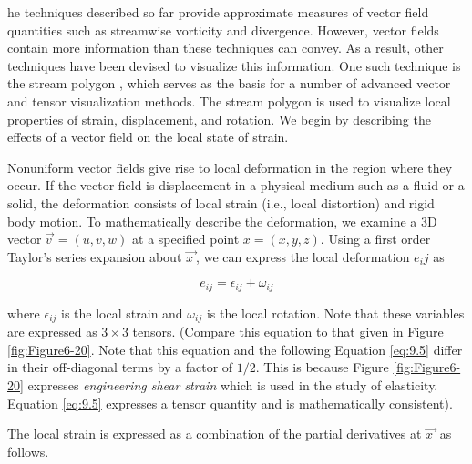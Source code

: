 he techniques described so far provide approximate measures of vector field quantities such as streamwise vorticity and divergence. However, vector fields contain more information than these techniques can convey. As a result, other techniques have been devised to visualize this information. One such technique is the stream polygon \cite{Schroeder91}, which serves as the basis for a number of advanced vector and tensor visualization methods. The stream polygon is used to visualize local properties of strain, displacement, and rotation. We begin by describing the effects of a vector field on the local state of strain.

Nonuniform vector fields give rise to local deformation in the region where they occur. If the vector field is displacement in a physical medium such as a fluid or a solid, the deformation consists of local strain (i.e., local distortion) and rigid body motion. To mathematically describe the deformation, we examine a 3D vector $\overrightarrow{v\ } = (u, v, w)$ at a specified point $x = (x, y, z)$. Using a first order Taylor's series expansion about $\overrightarrow{x\ }$, we can express the local deformation $e_ij$ as

\begin{equation}\label{eq:9.4}
e_{ij} = \epsilon_{ij} + \omega_{ij}
\end{equation}

where $\epsilon_{ij}$ is the local strain and $\omega_{ij}$ is the local rotation. Note that these variables are expressed as $3 \times 3$ tensors. (Compare this equation to that given in Figure \ref{fig:Figure6-20}. Note that this equation and the following Equation \ref{eq:9.5} differ in their off-diagonal terms by a factor of $1/2$. This is because Figure \ref{fig:Figure6-20} expresses \emph{engineering shear strain} which is used in the study of elasticity. Equation \ref{eq:9.5} expresses a tensor quantity and is mathematically consistent).

The local strain is expressed as a combination of the partial derivatives at $\overrightarrow{x\ }$ as follows.

